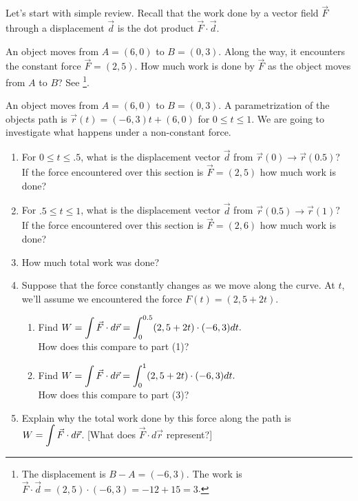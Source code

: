 Let's start with simple review. Recall that the work done by a vector field $\vec F$ through a displacement $\vec d$ is the dot product $\vec F\cdot \vec d$. 
\begin{review*}
 An object moves from $A=(6,0)$ to $B=(0,3)$. Along the way, it encounters the constant force $\vec F = (2,5)$.  How much work is done by $\vec F$ as the object moves from $A$ to $B$? See \footnote{The displacement is $B-A=(-6,3)$. The work is $\vec F\cdot \vec d = (2,5)\cdot(-6,3) = -12+15=3$.}.
\end{review*}

\begin{problem}
 An object moves from $A=(6,0)$ to $B=(0,3)$. A parametrization of the objects path is $\vec r(t) = (-6,3)t+(6,0)$ for $0\leq t\leq 1$. We are going to investigate what happens under a non-constant force. 
\begin{enumerate}
 \item  For $0\leq t\leq .5$, what is the displacement vector $\vec{d}$ from $\vec{r}(0) \rightarrow \vec{r}(0.5)$?\\
 If the force encountered over this section is $\vec F = (2,5)$ how much work is done?
\item For $.5\leq t\leq 1$, what is the displacement vector $\vec{d}$ from $\vec{r}(0.5) \rightarrow \vec{r}(1)$?\\
 If the force encountered over this section is $\vec F = (2,6)$ how much work is done?
\item How much total work was done?
 \item{}%
Suppose that the force constantly changes as we move along the curve. At $t$, we'll assume we encountered the force $F(t) = (2,5+2t)$. 
\begin{enumerate}[label=\roman*]
\item Find $\displaystyle W=\int \vec F\cdot d\vec r = \int_0^{0.5} (2,5+2t)\cdot (-6,3)dt.$\\ How does this compare to part (1)?
\item Find $\displaystyle W=\int \vec F\cdot d\vec r = \int_0^1 (2,5+2t)\cdot (-6,3)dt.$\\ How does this compare to part (3)?
\end{enumerate}
\item Explain why the total work done by this force along the path is \\ \indent $\displaystyle W=\int \vec F\cdot d\vec r$. [What does $\vec{F} \cdot d\vec{r}$ represent?] 
\end{enumerate}
\end{problem}

